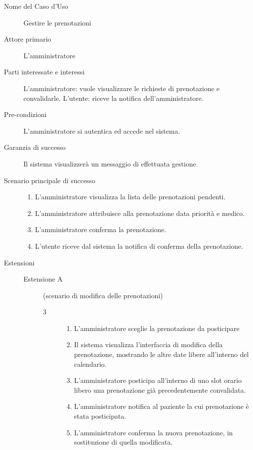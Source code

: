\begin{description} 
\item[Nome del Caso d'Uso]
	Gestire le prenotazioni

\item[Attore primario]
        L'amministratore

\item[Parti interessate e interessi]
\begin{itemize}
\diam L'amministratore: vuole visualizzare le richieste di prenotazione 
        e convalidarle.
\diam L'utente: riceve la notifica dell'amministratore.
\end{itemize}


\item[Pre-condizioni]
	L'amministratore si autentica ed accede nel sistema.

\item[Garanzia di successo]
        Il sistema visualizzerà un messaggio di effettuata gestione.

\item[Scenario principale di successo]
\begin{enumerate}
\item L'amministratore visualizza la lista delle prenotazioni pendenti.
\item L'amministratore attribuisce alla prenotazione data priorità e medico. 
\item L'amministratore conferma la prenotazione.
\item L'utente riceve dal sistema la notifica di conferma della prenotazione.
\end{enumerate}

\item[Estensioni]
\begin{description}
	\item[Estensione A] (scenario di modifica delle prenotazioni)
	\medskip
	
	\begin{description}
	\item[3]
	\begin{enumerate}
	\item L'amministratore sceglie la prenotazione da posticipare
	\item Il sistema visualizza l'interfaccia di modifica della prenotazione,
		mostrando le altre date libere all'interno del calendario.
	\item L'amministratore posticipa all'interno di uno slot orario libero
		una prenotazione già precedentemente convalidata.
	\item L'amministratore notifica al paziente la cui prenotazione è stata
		posticipata.
	\item L'amministratore conferma la nuova prenotazione, in sostituzione di 
		quella modificata.
	\end{enumerate}
	\end{description}
	

\end{description}
\end{description}
